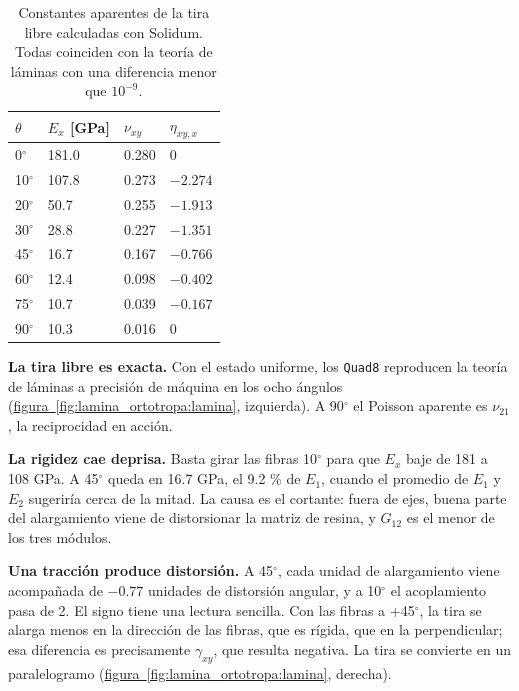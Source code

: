 \documentclass[11pt,oneside]{report}
\begin{document}
\begin{table}[h]
\centering
\caption{Constantes aparentes de la tira libre calculadas con Solidum. Todas coinciden con la teoría de láminas con una diferencia menor que $10^{-9}$.}
\begin{tabularx}{\textwidth}{YYYY}
\hline
\textbf{$\theta$} & \textbf{$E_x$ [GPa]} & \textbf{$\nu_{xy}$} & \textbf{$\eta_{xy,x}$} \\
\ensuremath{^{\circ}} & 181.0 & 0.280 & 0 \\
10\ensuremath{^{\circ}} & 107.8 & 0.273 & $-2.274$ \\
20\ensuremath{^{\circ}} & 50.7 & 0.255 & $-1.913$ \\
30\ensuremath{^{\circ}} & 28.8 & 0.227 & $-1.351$ \\
45\ensuremath{^{\circ}} & 16.7 & 0.167 & $-0.766$ \\
60\ensuremath{^{\circ}} & 12.4 & 0.098 & $-0.402$ \\
75\ensuremath{^{\circ}} & 10.7 & 0.039 & $-0.167$ \\
90\ensuremath{^{\circ}} & 10.3 & 0.016 & 0 \\
\hline
\end{tabularx}
\end{table}
\textbf{La tira libre es exacta.} Con el estado uniforme, los \texttt{Quad8} reproducen la teoría de láminas a precisión de máquina en los ocho ángulos (\hyperref[fig:lamina_ortotropa:lamina]{figura~\ref*{fig:lamina_ortotropa:lamina}}, izquierda). A 90\ensuremath{^{\circ}} el Poisson aparente es $\nu_{21}$, la reciprocidad en acción.

\textbf{La rigidez cae deprisa.} Basta girar las fibras 10\ensuremath{^{\circ}} para que $E_x$ baje de 181 a 108 GPa. A 45\ensuremath{^{\circ}} queda en 16.7 GPa, el 9.2 \% de $E_1$, cuando el promedio de $E_1$ y $E_2$ sugeriría cerca de la mitad. La causa es el cortante: fuera de ejes, buena parte del alargamiento viene de distorsionar la matriz de resina, y $G_{12}$ es el menor de los tres módulos.

\textbf{Una tracción produce distorsión.} A 45\ensuremath{^{\circ}}, cada unidad de alargamiento viene acompañada de $-0.77$ unidades de distorsión angular, y a 10\ensuremath{^{\circ}} el acoplamiento pasa de 2. El signo tiene una lectura sencilla. Con las fibras a +45\ensuremath{^{\circ}}, la tira se alarga menos en la dirección de las fibras, que es rígida, que en la perpendicular; esa diferencia es precisamente $\gamma_{xy}$, que resulta negativa. La tira se convierte en un paralelogramo (\hyperref[fig:lamina_ortotropa:lamina]{figura~\ref*{fig:lamina_ortotropa:lamina}}, derecha).
\end{document}
